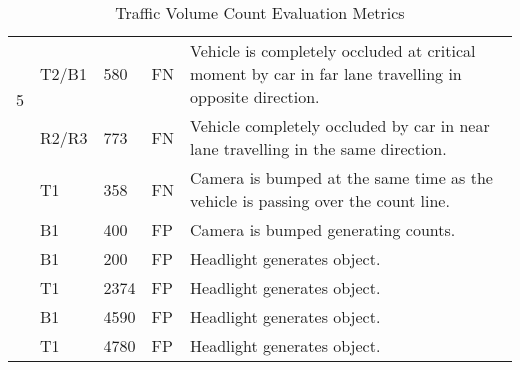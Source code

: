 \begin{table}[H]
\begin{tabular}{|p{1cm}p{1cm}p{1cm}p{1cm}p{10cm}|}
    \multirow{2}{1em}{5}  
    &T2/B1&580&FN&Vehicle is completely occluded at critical moment by car in far lane travelling in opposite direction.\\\cline{2-5}
    &R2/R3&773&FN&Vehicle completely occluded by car in near lane travelling in the same direction.\\\Xhline{1pt}
    
    \multirow{1}{1em}{6}  
    &T1&358&FN&Camera is bumped at the same time as the vehicle is passing over the count line.\\\Xhline{1pt}

    \multirow{5}{1em}{7}  
    &B1&400&FP&Camera is bumped generating counts.\\\cline{2-5}
    &B1&200&FP&Headlight generates object.\\\cline{2-5}
    &T1&2374&FP&Headlight generates object.\\\cline{2-5}
    &B1&4590&FP&Headlight generates object.\\\cline{2-5}
    &T1&4780&FP&Headlight generates object.\\\hline


\end{tabular}
\caption{Traffic Volume Count Evaluation Metrics}
\label{table:false_readings}
\end{table}